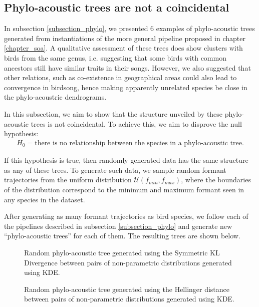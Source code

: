 \documentclass[../main.tex]{subfiles}
\begin{document}
\subsection{Phylo-acoustic trees are not a coincidental} \label{subsection_null}
In subsection \ref{subsection_phylo}, we presented 6 examples of phylo-acoustic trees generated from instantiations of the more general pipeline proposed in chapter \ref{chapter_soa}. A qualitative assessment of these trees does show clusters with birds from the same genus, i.e. suggesting that some birds with common ancestors still have similar traits in their songs. However, we also suggested that other relations, such as co-existence in geographical areas could also lead to convergence in birdsong, hence making apparently unrelated species be close in the phylo-acoustric dendrograms.
\par In this subsection, we aim to show that the structure unveiled by these phylo-acoustic trees is not coincidental. To achieve this, we aim to disprove the null hypothesis:
\begin{align*}
H_0 = \text{there is no relationship between the species in a phylo-acoustic tree.}
\end{align*}
\par If this hypothesis is true, then randomly generated data has the same structure as any of these trees. To generate such data, we sample random formant trajectories from the uniform distribution $\mathcal{U}(f_{min}, f_{max})$, where the boundaries of the distribution correspond to the minimum and maximum formant seen in any species in the dataset. 
\par After generating as many formant trajectories as bird species, we follow each of the pipelines described in subsection \ref{subsection_phylo} and generate new ``phylo-acoustic trees'' for each of them. The resulting trees are shown below.
\begin{sidewaysfigure}[!ht]
\noindent{}
    \caption{Random phylo-acoustic tree generated using the Symmetric KL Divergence between pairs of non-parametric distributions generated using KDE.}
    \label{fig:rkdeskld}
\end{sidewaysfigure}


\begin{sidewaysfigure}[!ht]
\noindent{}
    \caption{Random phylo-acoustic tree generated using the Hellinger distance between pairs of non-parametric distributions generated using KDE.}
    \label{fig:rkdehellinger}
\end{sidewaysfigure}
\end{document}
